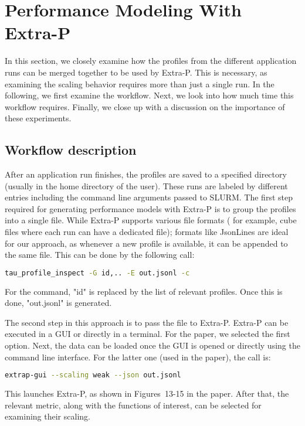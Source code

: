\section{Performance Modeling With Extra-P}
\label{sec:extra-p}
In this section, we closely examine how the profiles from the different application runs 
can be merged together to be used by Extra-P. This is necessary, as examining the scaling 
behavior requires more than just a single run. In the following, we first examine the workflow. 
Next, we look into how much time this workflow requires. Finally, we close up with a discussion 
on the importance of these experiments. 

\subsection{Workflow description}
After an application run finishes, the profiles are saved to a specified directory (usually in 
the home directory of the user). 
These runs are labeled by different entries including the command line arguments passed to SLURM. 
The first step required for generating performance models with Extra-P is to group the 
profiles into a single file. While Extra-P supports various file formats ( 
for example, cube files where each run can have a dedicated file); formats like JsonLines 
are ideal for our approach, as whenever a new profile is available, it can be appended to the same 
file. This can be done by the following call: 
\begin{lstlisting}[language=bash]
tau_profile_inspect -G id,.. -E out.jsonl -c 
\end{lstlisting}
For the command, "id" is replaced by the list of relevant profiles. Once this is done, "out.jsonl" 
is generated. 

The second step in this approach is to pass the file to Extra-P. 
Extra-P can be executed in a GUI or directly in a terminal. For the paper, 
we selected the first option. Next, the data can be loaded once the GUI is opened or 
directly using the command line interface. For the latter one (used in the paper), the call is:
\begin{lstlisting}[language=bash]
extrap-gui --scaling weak --json out.jsonl
\end{lstlisting}

This launches Extra-P, as shown in Figures~13-15 in the paper. After that, the relevant 
metric, along with the functions of interest, can be selected for examining their scaling. 


